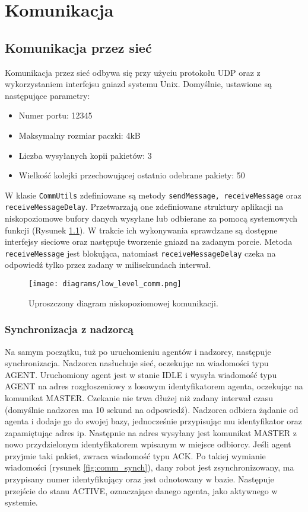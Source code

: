 \chapter{Komunikacja}
\label{ch:komunikacja}

\section{Komunikacja przez sieć}

Komunikacja przez sieć odbywa się przy użyciu protokołu UDP oraz z wykorzystaniem interfejsu gniazd systemu Unix. Domyślnie, ustawione są następujące parametry:
\begin{itemize}
    \item Numer portu: 12345
    \item Maksymalny rozmiar paczki: 4kB
    \item Liczba wysyłanych kopii pakietów: 3
    \item Wielkość kolejki przechowującej ostatnio odebrane pakiety: 50
\end{itemize}

W klasie {\tt CommUtils} zdefiniowane są metody {\tt sendMessage, receiveMessage} oraz {\tt receiveMessageDelay}. Przetwarzają one zdefiniowane struktury aplikacji na niskopoziomowe bufory danych wysyłane lub odbierane za pomocą systemowych funkcji (Rysunek \ref{fig:low_level_comm}). W trakcie ich wykonywania sprawdzane są dostępne interfejsy sieciowe oraz następuje tworzenie gniazd na zadanym porcie. Metoda {\tt receiveMessage} jest blokująca, natomiast {\tt receiveMessageDelay} czeka na odpowiedź tylko przez zadany w milisekundach interwał.

\begin{figure}[!ht]
    \centering
        \texttt{[image: diagrams/low\_level\_comm.png]}
    \caption{Uproszczony diagram niskopoziomowej komunikacji.\label{fig:low_level_comm}}
\end{figure}

\subsection{Synchronizacja z nadzorcą}

Na samym początku, tuż po uruchomieniu agentów i nadzorcy, następuje synchronizacja. Nadzorca nasłuchuje sieć, oczekując na wiadomości typu AGENT. Uruchomiony agent jest w stanie IDLE i wysyła wiadomość typu AGENT na adres rozgłoszeniowy z losowym identyfikatorem agenta, oczekując na komunikat MASTER. Czekanie nie trwa dłużej niż zadany interwał czasu (domyślnie nadzorca ma 10 sekund na odpowiedź). Nadzorca odbiera żądanie od agenta i dodaje go do swojej bazy, jednocześnie przypisując mu identyfikator oraz zapamiętując adres ip. Następnie na adres wysyłany jest komunikat MASTER z nowo przydzielonym identyfikatorem wpisanym w miejsce odbiorcy. Jeśli agent przyjmie taki pakiet, zwraca wiadomość typu ACK. Po takiej wymianie wiadomości (rysunek \ref{fig:comm_synch}), dany robot jest zsynchronizowany, ma przypisany numer identyfikujący oraz jest odnotowany w bazie. Następuje przejście do stanu ACTIVE, oznaczające danego agenta, jako aktywnego w systemie.

